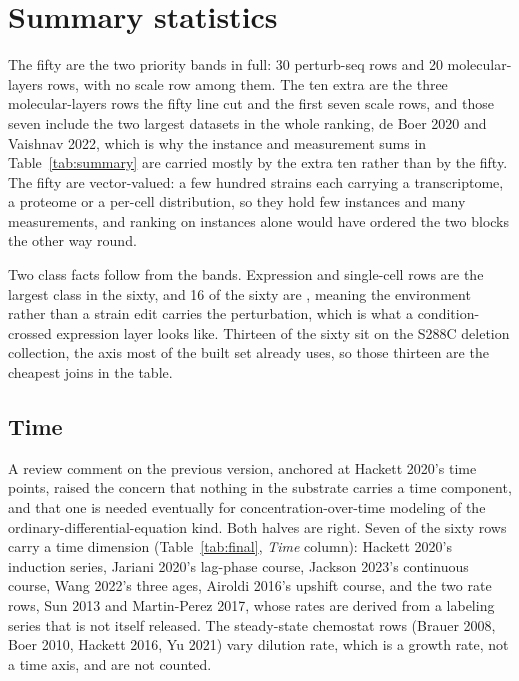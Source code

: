 
\clearpage
\section{Summary statistics}\label{sec:summary}



The fifty are the two priority bands in full: 30 perturb-seq rows and 20 molecular-layers
rows, with no scale row among them. The ten extra are the three molecular-layers rows the
fifty line cut and the first seven scale rows, and those seven include the two largest
datasets in the whole ranking, de Boer 2020 and Vaishnav 2022, which is why the instance
and measurement sums in Table~\ref{tab:summary} are carried mostly by the extra ten rather
than by the fifty. The fifty are vector-valued: a few hundred strains each carrying a
transcriptome, a proteome or a per-cell distribution, so they hold few instances and many
measurements, and ranking on instances alone would have ordered the two blocks the other
way round.

Two class facts follow from the bands. Expression and single-cell rows are the largest
class in the sixty, and 16 of the sixty are , meaning the environment
rather than a strain edit carries the perturbation, which is what a condition-crossed
expression layer looks like. Thirteen of the sixty sit on the S288C deletion collection,
the axis most of the built set already uses, so those thirteen are the cheapest joins in the
table.

\subsection{Time}\label{sec:time}

A review comment on the previous version, anchored at Hackett 2020's time points, raised
the concern that nothing in the substrate carries a time component, and that one is needed
eventually for concentration-over-time modeling of the ordinary-differential-equation
kind. Both halves are right. Seven of the sixty rows carry a time dimension
(Table~\ref{tab:final}, \emph{Time} column): Hackett 2020's induction series, Jariani 2020's
lag-phase course, Jackson 2023's continuous course, Wang 2022's three ages, Airoldi 2016's
upshift course, and the two rate rows, Sun 2013 and Martin-Perez 2017, whose rates are
derived from a labeling series that is not itself released. The steady-state chemostat
rows (Brauer 2008, Boer 2010, Hackett 2016, Yu 2021) vary dilution rate, which is a growth
rate, not a time axis, and are not counted.

